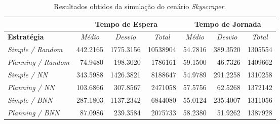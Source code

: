 \begin{table}[htb!]
\centering
\caption{Resultados obtidos da simulação do cenário \textit{Skyscraper}.}
\label{tab:results:skyscraper}
\begin{tabular}{|l|r|r|r|r|r|r|}
\hline
\multicolumn{1}{|c|}{\textbf{}}                 & \multicolumn{3}{c|}{\textbf{Tempo de Espera}}                                                                    & \multicolumn{3}{c|}{\textbf{Tempo de Jornada}}                                                                                                                       \\ \hline
\textbf{Estratégia} & \multicolumn{1}{c|}{\textit{Médio}} & \multicolumn{1}{c|}{\textit{Desvio}} & \multicolumn{1}{c|}{\textit{Total}} & \multicolumn{1}{c|}{\textit{Médio}}                   & \multicolumn{1}{c|}{\textit{Desvio}}                  & \multicolumn{1}{c|}{\textit{Total}}                  \\ \hline
\textit{Simple / Random}          & \cellcolor[HTML]{FD6864}442.2165  & \cellcolor[HTML]{FD6864}1775.3156   & \cellcolor[HTML]{FD6864}10538904  & 54.7816                         & \cellcolor[HTML]{FD6864}389.3520  & 1305554                         \\ \hline
\textit{Planning / Random}        & \cellcolor[HTML]{67FD9A}74.9480   & \cellcolor[HTML]{67FD9A}198.3020    & \cellcolor[HTML]{67FD9A}1786161   & \cellcolor[HTML]{FD6864}59.1500 & \cellcolor[HTML]{67FD9A}46.7326   & \cellcolor[HTML]{FD6864}1409662 \\ \hline
\textit{Simple / NN}              & 343.5988                          & 1426.3821                           &  8188647                          & 54.9789                         & 291.2258                          & 1310258                         \\ \hline
\textit{Planning / NN}            & 103.6866                          &  307.8567                           &  2471058                          & 57.5756                         &  62.5268                          & 1372142                         \\ \hline
\textit{Simple / BNN}             & 287.1803                          & 1137.2342                           &  6844080                          & 55.0124                         & 235.4007                          & 1311056                         \\ \hline
\textit{Planning / BNN}           &  87.0986                          &  239.3584                           &  2075733                          & 58.2380                         &  51.9262                          & 1387928                         \\ \hline

\end{tabular}
\end{table}
